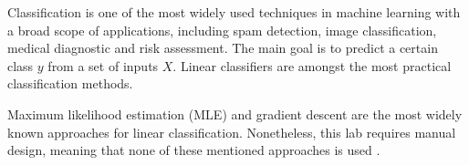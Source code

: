 Classification is one of the most widely used techniques in machine learning with a broad scope of applications, including spam detection, image classification, medical diagnostic and risk assessment. The main goal is to predict a certain class $y$ from a set of inputs $X$. Linear classifiers are amongst the most practical classification methods.

Maximum likelihood estimation (MLE) and gradient descent are the most widely known approaches for linear classification. Nonetheless, this lab requires manual design, meaning that none of these mentioned approaches is used \cite{classification}.

